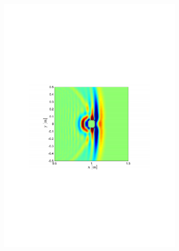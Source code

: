 \begin{figure}
\begin{subfigure}[b]{0.48\textwidth}
                \includegraphics[width=\textwidth]{grafiken/02_Konzeptionierung/sim_wave_3000_3}
        \end{subfigure}
        ~ %
        \begin{subfigure}[b]{0.48\textwidth}
                \centering

\end{subfigure}
\end{figure}
